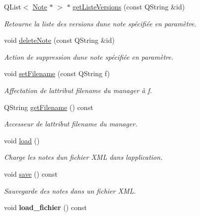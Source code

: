 \begin{DoxyCompactItemize}
Q\+List$<$ \hyperlink{class_note}{Note} $\ast$ $>$ $\ast$ \hyperlink{class_notes_manager_ae3af78108c46b9816207e66fcde64c5b}{get\+Liste\+Versions} (const Q\+String \&id)
\begin{DoxyCompactList}\small\item\em Retourne la liste des versions d\textquotesingle{}une note spécifiée en paramètre. \end{DoxyCompactList}\item 
void \hyperlink{class_notes_manager_a989429244c36c35ef68204f6ae2a0a5f}{delete\+Note} (const Q\+String \&id)
\begin{DoxyCompactList}\small\item\em Action de suppression d\textquotesingle{}une note spécifiée en paramètre. \end{DoxyCompactList}\item 
void \hyperlink{class_notes_manager_a797d858176de3f5e64aa8194797909fb}{set\+Filename} (const Q\+String f)
\begin{DoxyCompactList}\small\item\em Affectation de l\textquotesingle{}attribut filename du manager à f. \end{DoxyCompactList}\item 
Q\+String \hyperlink{class_notes_manager_a566cbb0dd7b606ec34629a2aa8010b73}{get\+Filename} () const
\begin{DoxyCompactList}\small\item\em Accesseur de l\textquotesingle{}attribut filename du manager. \end{DoxyCompactList}\item 
void \hyperlink{class_notes_manager_ad4fb2de50633dd25b71024343341cd64}{load} ()
\begin{DoxyCompactList}\small\item\em Charge les notes d\textquotesingle{}un fichier X\+ML dans l\textquotesingle{}application. \end{DoxyCompactList}\item 
void \hyperlink{class_notes_manager_ad271bd7f8079b01b04a32b886b498bac}{save} () const
\begin{DoxyCompactList}\small\item\em Sauvegarde des notes dans un fichier X\+ML. \end{DoxyCompactList}\item 
\mbox{\label{class_notes_manager_a716744a0992b0ce74d43d80c7d987531}} 
void {\bfseries load\+\_\+fichier} () const

\end{DoxyCompactItemize}

